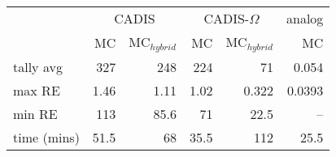 \begin{tabular}{lrrrrr}
\toprule
{} & \multicolumn{2}{c}{CADIS}   & \multicolumn{2}{c}{CADIS-$\Omega$}  & analog \\
{} &    MC & MC$_{hybrid}$ &         MC & MC$_{hybrid}$ &     MC \\
\midrule
tally avg   &   327 &         248 &        224 &          71 &  0.054 \\
max RE      &  1.46 &        1.11 &       1.02 &       0.322 & 0.0393 \\
min RE      &   113 &        85.6 &         71 &        22.5 &    -- \\
time (mins) &  51.5 &          68 &       35.5 &         112 &   25.5 \\
\bottomrule
\end{tabular}
